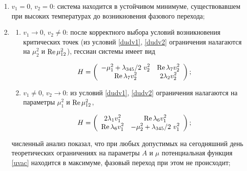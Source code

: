 \begin{enumerate}

\item $v_1=0$, $v_2=0$: система находится в устойчивом минимуме, существовавшем при высоких температурах до возникновения фазового перехода;

\item

        \begin{enumerate}

                 \item[a)] $v_1 \rightarrow 0$, $v_2 \ne 0$: после корректного выбора условий возникновения критических точек (из условий \eqref{dudv1},  \eqref{dudv2} ограничения налагаются на $\mu_2^2$ и $\mathop{\rm Re} \mu_{12}^2$), гессиан системы имеет вид

                      \begin{equation}

                        H = \displaystyle \left(\begin{array}{cc}  \displaystyle -\mu_1^2+\lambda_{345}/{2} \ v_2^2 & \displaystyle\mathop{\rm Re} \lambda_7 v_2^2 \\

                        \displaystyle\mathop{\rm Re} \lambda_7 v_2^2 & \displaystyle 2 \lambda_2 v_2^2 \end{array}\right);

                      \end{equation}

                 \item[б)]  $v_1 \ne 0$, $v_2 \to 0$: из условий \eqref{dudv1}, \eqref{dudv2} ограничения налагаются на параметры $\mu_1^2$ и $\mathop{\rm Re} \mu_{12}^2$,

                    \begin{equation}

                           H = \displaystyle \left(\begin{array}{cc}  \displaystyle 2 \lambda_1 v_1^2 & \displaystyle\mathop{\rm Re} \lambda_6 v_1^2 \\

                              \displaystyle\mathop{\rm Re} \lambda_6 v_1^2 & \displaystyle -\mu_2^2+\lambda_{345}/{2} \ v_1^2 \end{array}\right);

                      \end{equation}

                       \end{enumerate}



численный анализ показал, что при любых допустимых на сегодняшний день теоретических  ограничениях на параметры $A$ и $\mu$ потенциальная функция \eqref{uvac} находится в максимуме, фазовый переход при этом не происходит;



\end{enumerate}











